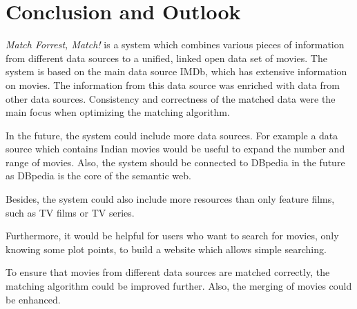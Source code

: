 \section{Conclusion and Outlook}
\label{sec_conclusion}

\emph{Match Forrest, Match!} is a system which combines various pieces of information from different data sources to a unified, linked open data set of movies.
The system is based on the main data source IMDb, which has extensive information on movies.
The information from this data source was enriched with data from other data sources.
Consistency and correctness of the matched data were the main focus when optimizing the matching algorithm.

In the future, the system could include more data sources.
For example a data source which contains Indian movies would be useful to expand the number and range of movies.
Also, the system should be connected to DBpedia in the future as DBpedia is the core of the semantic web.

Besides, the system could also include more resources than only feature films, such as TV films or TV series.

Furthermore, it would be helpful for users who want to search for movies, only knowing some plot points, to build a website which allows simple searching.

To ensure that movies from different data sources are matched correctly, the matching algorithm could be improved further.
Also, the merging of movies could be enhanced.